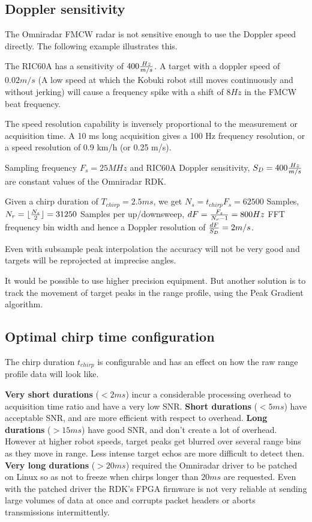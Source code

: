 \subsection{Doppler sensitivity}\label{doppler-sensitivity}

The Omniradar FMCW radar is not sensitive enough to use the Doppler
speed directly. The following example illustrates this.

The RIC60A has a sensitivity of \(400 {Hz\over{m/s}}\). A target with a
doppler speed of \(0.02 m/s\) (A low speed at which the Kobuki robot
still moves continuously and without jerking) will cause a frequency
spike with a shift of \(8Hz\) in the FMCW beat frequency.

The speed resolution capability is inversely proportional to the
measurement or acquisition time. A 10 ms long acquisition gives a 100 Hz
frequency resolution, or a speed resolution of 0.9 km/h (or 0.25 m/s).

Sampling frequency \(F_s=25MHz\) and RIC60A Doppler sensitivity,
\(S_D = 400 {Hz\over{m/s}}\) are constant values of the Omniradar RDK.

Given a chirp duration of \(T_{chirp} = 2.5ms\), we get
\(N_s = t_{chirp} F_s = 62500\) Samples,
\(N_r = \lfloor {N_s \over{2} }\rfloor = 31250\) Samples per
up/downsweep, \(dF = {F_s \over{N_r - 1}} = 800 Hz\) FFT frequency bin
width and hence a Doppler resolution of \({dF \over{S_D}} = 2 m/s\).

Even with subsample peak interpolation the accuracy will not be very
good and targets will be reprojected at imprecise angles.

It would be possible to use higher precision equipment. But another
solution is to track the movement of target peaks in the range profile,
using the Peak Gradient algorithm.

\subsection{Optimal chirp time
configuration}\label{optimal-chirp-time-configuration}

The chirp duration \(t_{chirp}\) is configurable and has an effect on
how the raw range profile data will look like.

\textbf{Very short durations} (\(<2ms\)) incur a considerable processing
overhead to acquisition time ratio and have a very low SNR.
\textbf{Short durations} (\(<5ms\)) have acceptable SNR, and are more
efficient with respect to overhead. \textbf{Long durations} (\(>15ms\))
have good SNR, and don't create a lot of overhead. However at higher
robot speeds, target peaks get blurred over several range bins as they
move in range. Less intense target echos are more difficult to detect
then. \textbf{Very long durations} (\(>20ms\)) required the Omniradar
driver to be patched on Linux so as not to freeze when chirps longer
than \(20ms\) are requested. Even with the patched driver the RDK's FPGA
firmware is not very reliable at sending large volumes of data at once
and corrupts packet headers or aborts transmissions intermittently.

